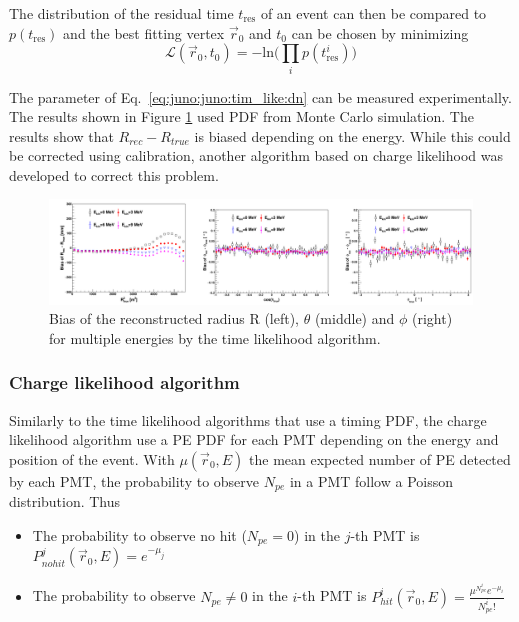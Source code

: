 \documentclass[../main.tex]{subfiles}
\begin{document}
The distribution of the residual time $t_{\mathrm{res}}$ of an event can then be compared to $p(t_{\mathrm{res}})$ and the best fitting vertex $\vec{r}_0$ and $t_0$ can be chosen by minimizing
\begin{equation}
  \mathcal{L}(\vec{r}_0, t_0) = - \mathrm{ln} \bigg(\prod_i p(t^i_{\mathrm{res}}) \bigg)
\end{equation}

The parameter of Eq.\ \ref{eq:juno:juno:tim_like:dn} can be measured experimentally. The results shown in Figure \ref{fig:juno:rec:time_likelihood} used PDF from Monte Carlo simulation. The results show that $R_{rec} - R_{true}$ is biased depending on the energy. While this could be corrected using calibration, another algorithm based on charge likelihood was developed to correct this problem.

\begin{figure}[ht]
  \centering
  \includegraphics[width=\linewidth]{images/juno/reco/time_likelihood_results.png}
  \caption{Bias of the reconstructed radius R (left), $\theta$ (middle) and $\phi$ (right) for multiple energies by the time likelihood algorithm.}
  \label{fig:juno:rec:time_likelihood}
\end{figure}


\subsubsection{Charge likelihood algorithm}

Similarly to the time likelihood algorithms that use a timing PDF, the charge likelihood algorithm use a PE PDF for each PMT depending on the energy and position of the event. With $\mu(\vec{r}_0, E)$ the mean expected number of PE detected by each PMT, the probability to observe $N_{pe}$ in a PMT follow a Poisson distribution. Thus
\begin{itemize}
  \item The probability to observe no hit ($N_{pe} = 0$) in the $j$-th PMT is $P^{j}_{nohit} (\vec{r}_0, E) = e^{-\mu_j}$
  \item The probability to observe $N_{pe} \neq 0$ in the $i$-th PMT is $P^{i}_{hit} (\vec{r}_0, E) = \frac{\mu^{N^i_{pe}} e^{-\mu_i}}{N^i_{pe}!}$
\end{itemize}
\end{document}
